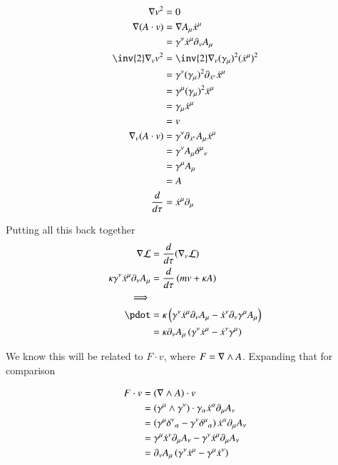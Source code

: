 \begin{align*}
\grad v^2 &= 0 \\
\grad (A \cdot v)
&= \grad A_\mu \xdot^\mu \\
&= \gamma^\nu \xdot^\mu \partial_\nu A_\mu \\
\inv{2} \grad_v v^2 
&= \inv{2} \grad_v (\gamma_\mu)^2 (\xdot^\mu)^2 \\
&= \gamma^\nu (\gamma_\mu)^2 \partial_{\xdot^\nu} \xdot^\mu \\
&= \gamma^\mu (\gamma_\mu)^2 \xdot^\mu \\
&= \gamma_\mu \xdot^\mu \\
&= v \\
\grad_v (A \cdot v)
&= \gamma^\nu \partial_{\xdot^\nu} A_\mu \xdot^\mu \\
&= \gamma^\nu A_\mu {\delta^\mu}_\nu \\
&= \gamma^\mu A_\mu \\
&= A \\
\frac{d}{d\tau} &= \xdot^\mu \partial_\mu
\end{align*}

Putting all this back together 
\begin{align*}
\grad \LL &= \frac{d}{d\tau}(\grad_v \LL) \\
\kappa \gamma^\nu \xdot^\mu \partial_\nu A_\mu &= \frac{d}{d\tau}\left( m v + \kappa A \right) \\
\implies \\
\pdot 
&= \kappa \left( \gamma^\nu \xdot^\mu \partial_\nu A_\mu - \xdot^\nu \partial_\nu \gamma^\mu A_\mu \right) \\
&= \kappa \partial_\nu A_\mu \left( \gamma^\nu \xdot^\mu - \xdot^\nu \gamma^\mu \right) \\
\end{align*}

We know this will be related to $F \cdot v$, where $F = \nabla \wedge A$.  Expanding that for comparison

\begin{align*}
F \cdot v
&= (\nabla \wedge A) \cdot v \\
&= (\gamma^\mu \wedge \gamma^\nu) \cdot \gamma_\alpha \dot{x}^\alpha \partial_\mu A_\nu \\
&= \left( \gamma^\mu {\delta^\nu}_\alpha -\gamma^\nu {\delta^\mu}_\alpha \right) \dot{x}^\alpha \partial_\mu A_\nu \\
&= 
\gamma^\mu \dot{x}^\nu \partial_\mu A_\nu 
-\gamma^\nu \dot{x}^\mu \partial_\mu A_\nu \\
&= \partial_\nu A_\mu \left( \gamma^\nu \dot{x}^\mu -\gamma^\mu \dot{x}^\nu \right) \\
\end{align*}

